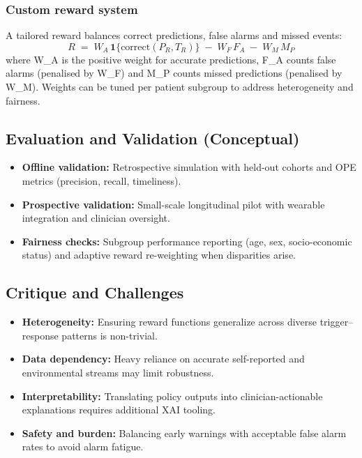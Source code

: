 \subsubsection*{Custom reward system}
A tailored reward balances correct predictions, false alarms and missed events:
\begin{equation}\label{eq:reward}
R \;=\; W_A\,\mathbf{1}\{\mathrm{correct}(P_R,T_R)\}
      \;-\; W_F\,F_A \;-\; W_M\,M_P
\end{equation}
where W\_A is the positive weight for accurate predictions, F\_A counts false alarms (penalised by W\_F) and M\_P counts missed predictions (penalised by W\_M). Weights can be tuned per patient subgroup to address heterogeneity and fairness.

\subsection*{Evaluation and Validation (Conceptual)}
\begin{itemize}
    \item \textbf{Offline validation:} Retrospective simulation with held-out cohorts and OPE metrics (precision, recall, timeliness).
    \item \textbf{Prospective validation:} Small-scale longitudinal pilot with wearable integration and clinician oversight.
    \item \textbf{Fairness checks:} Subgroup performance reporting (age, sex, socio-economic status) and adaptive reward re-weighting when disparities arise.
\end{itemize}

\subsection*{Critique and Challenges}
\begin{itemize}
    \item \textbf{Heterogeneity:} Ensuring reward functions generalize across diverse trigger–response patterns is non-trivial.
    \item \textbf{Data dependency:} Heavy reliance on accurate self-reported and environmental streams may limit robustness.
    \item \textbf{Interpretability:} Translating policy outputs into clinician-actionable explanations requires additional XAI tooling.
    \item \textbf{Safety and burden:} Balancing early warnings with acceptable false alarm rates to avoid alarm fatigue.
\end{itemize}

